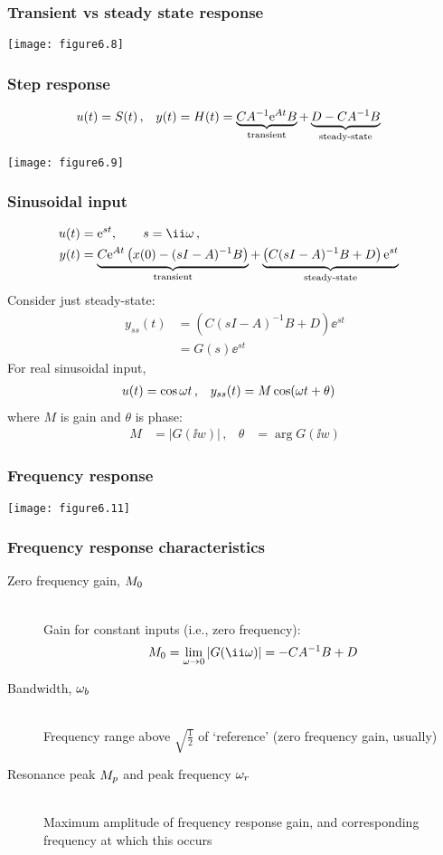 \documentclass{beamer-control}
\begin{document}
\begin{frame}
\frametitle{Transient vs steady state response}
\texttt{[image: figure6.8]}
\end{frame}

\begin{frame}
\frametitle{Step response}
\begin{align}
u(t) &= S(t)\,, & y(t) &= H(t) = \underbrace{CA^{-1} \mathrm{e}^{At} B}_{\text{transient}} + \underbrace{D-CA^{-1}B}_{\text{steady-state}}
\end{align}

\texttt{[image: figure6.9]}

\end{frame}



\begin{frame}
\frametitle{Sinusoidal input}

\begin{align}
u(t) &= \ee^{st}, \qquad s=\ii\ww\,,\\
y(t) &= \underbrace{C \ee^{At} \left( x(0)-(sI-A)^{-1}B \right)}_{\text{transient}} + \underbrace{\left(C(sI-A)^{-1}B+D\right)\ee^{st}}_{\text{steady-state}} & 
\end{align}
Consider just steady-state:
\begin{align}
y_{ss}(t) &= \left(C(sI-A)^{-1}B+D\right)\ee^{st} \\
        &= G(s) \ee^{st}
\end{align}
For real sinusoidal input, 
\begin{align}
  u(t)&=\cos\omega t \,, &  y_{ss}(t)&= M \cos(\omega t + \theta)
\end{align}
where $M$ is gain and $\theta$ is phase:
\begin{align}
M &= |G(\ii w)| \,, & \theta &= \arg G(\ii w)
\end{align}

\end{frame}

\begin{frame}
\frametitle{Frequency response}
\texttt{[image: figure6.11]}
\end{frame}

\begin{frame}
\frametitle{Frequency response characteristics}
\begin{description}
\item[Zero frequency gain, $M_0$] ~\\Gain for constant inputs (i.e., zero frequency): \[\DCgain = \lim_{\ww\to0}|G(\ii\ww)| = -CA^{-1}B+D\]
\item[Bandwidth, $\omega_b$] ~\\Frequency range above $\sqrt{\frac12}$ of `reference' (zero frequency gain, usually)
\item[Resonance peak $M_p$ and peak frequency $\omega_r$] ~\\Maximum amplitude of frequency response gain, and corresponding frequency at which this occurs
\end{description}
\end{frame}

\SUMMARYFRAME
\FINALE
\end{document}
